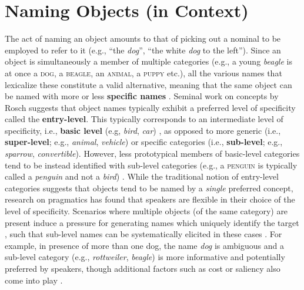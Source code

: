 \documentclass[runningheads]{llncs}
\newcommand{\refexp}[1]{\textsl{#1}}
\newcommand{\cat}[1]{\textsc{#1}}
\begin{document}
\section{Naming Objects (in Context)}
\label{sec:object_naming}

The act of naming an object amounts to that of picking out a nominal to be employed to refer to it (e.g., ``the \refexp{dog}'', ``the white \refexp{dog} to the left'').
Since an object is simultaneously a member of multiple categories (e.g., a young \refexp{beagle} is at once a \cat{dog}, a \cat{beagle}, an \cat{animal}, a \cat{puppy} etc.), all the various names that lexicalize these constitute a valid alternative, meaning that the same object can be named with more or less \textbf{specific names} \cite{brown1958shall,murphy2004big}. 
Seminal work on concepts by Rosch suggests that object names typically exhibit a preferred level of specificity called the \textbf{entry-level}. This typically corresponds to an intermediate level of specificity, i.e., \textbf{basic level} (e.g, \refexp{bird}, \refexp{car}) \cite{rosch1976basic}, as opposed to more generic (i.e., \textbf{super-level}; e.g., \refexp{animal}, \refexp{vehicle}) or specific categories (i.e., \textbf{sub-level}; e.g., \refexp{sparrow}, \refexp{convertible}). However, less prototypical members of basic-level categories tend to be instead identified with sub-level categories (e.g., a \cat{penguin} is typically called a \refexp{penguin} and not a \refexp{bird}) \cite{jolicoeur1984pictures}. 
While the traditional notion of entry-level categories suggests that objects tend to be named by a \refexp{single} preferred concept, research on pragmatics has found that speakers are flexible in  
their choice of the level of specificity. 
Scenarios where multiple objects (of the same category) are present induce a pressure for generating names which uniquely identify the target \cite{olson1970language}, such that sub-level names can be systematically elicited in these cases %
\cite{rohde2012communicating}\cite{graf2016animal}.
For example, in presence of more than one dog, the name \textsl{dog} is ambiguous and a sub-level category (e.g., \textsl{rottweiler}, \textsl{beagle}) is more informative and potentially preferred by speakers, though additional factors such as cost or saliency also come into play \cite{graf2016animal}\cite{clark1983common}.
\end{document}

